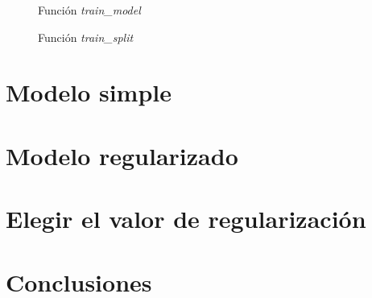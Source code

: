 \documentclass[6pt]{../../shared/AiTex}
\begin{document}
\begin{figure}[H]
    \centering
    
    \caption{Función \textit{train\_model}}
    \label{fig:train_model}
\end{figure}

\begin{figure}[H]
    \centering
    
    \caption{Función \textit{train\_split}}
    \label{fig:train_split}
\end{figure}

\section{Modelo simple}

\section{Modelo regularizado}

\section{Elegir el valor de regularización}

\section{Conclusiones}
\end{document}
